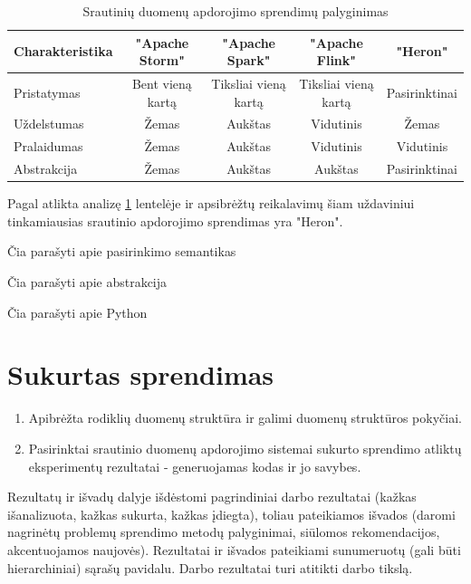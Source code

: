 \documentclass{VUMIFPSbakalaurinis}
\begin{document}
\begin{table}[!htbp]
    \begin{center}
        \caption{Srautinių duomenų apdorojimo sprendimų palyginimas}
        \label{table:comparer}
        \begin{tabular}{ | l | c | c | c | c | } 
            \hline
            \cellcolor[gray]{0.8} Charakteristika & \cellcolor[gray]{0.9} "Apache Storm" & \cellcolor[gray]{0.9} "Apache Spark" & \cellcolor[gray]{0.9} "Apache Flink" & \cellcolor[gray]{0.9} "Heron" \\* \hline
            \cellcolor[gray]{0.9} Pristatymas & Bent vieną kartą & Tiksliai vieną kartą & Tiksliai vieną kartą & Pasirinktinai \\* \hline
            \cellcolor[gray]{0.9} Uždelstumas & Žemas & Aukštas & Vidutinis & Žemas \\* \hline
            \cellcolor[gray]{0.9} Pralaidumas & Žemas & Aukštas & Vidutinis & Vidutinis \\* \hline
            \cellcolor[gray]{0.9} Abstrakcija & Žemas & Aukštas & Aukštas & Pasirinktinai \\* \hline
        \end{tabular}
    \end{center}
\end{table}\par

Pagal atlikta analizę \ref{table:comparer} lentelėje ir apsibrėžtų reikalavimų šiam uždaviniui tinkamiausias srautinio apdorojimo sprendimas yra "Heron". \par
Čia parašyti apie pasirinkimo semantikas \par
Čia parašyti apie abstrakcija \par
Čia parašyti apie Python \par
 

\section{Sukurtas sprendimas}



\begin{enumerate}
    \item Apibrėžta rodiklių duomenų struktūra ir galimi duomenų struktūros pokyčiai.
    \item Pasirinktai srautinio duomenų apdorojimo sistemai sukurto sprendimo atliktų eksperimentų rezultatai - generuojamas kodas ir jo savybes. 
\end{enumerate}

Rezultatų ir išvadų dalyje išdėstomi pagrindiniai darbo rezultatai (kažkas
išanalizuota, kažkas sukurta, kažkas įdiegta), toliau pateikiamos išvados
(daromi nagrinėtų problemų sprendimo metodų palyginimai, siūlomos
rekomendacijos, akcentuojamos naujovės). Rezultatai ir išvados pateikiami
sunumeruotų (gali būti hierarchiniai) sąrašų pavidalu. Darbo rezultatai turi
atitikti darbo tikslą.

\printbibliography[heading=bibintoc] 


\appendix 
\end{document}
